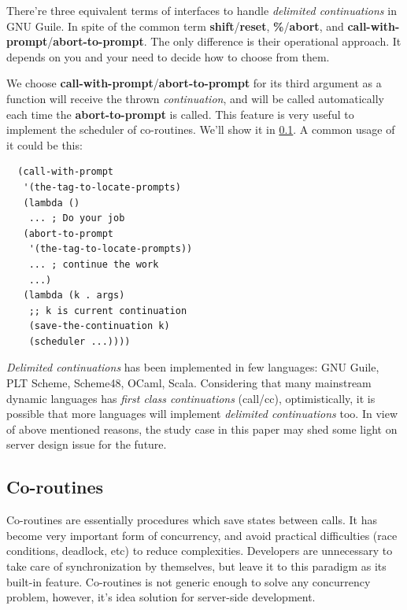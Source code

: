 \documentclass[numbers,numberedpars]{sigplanconf}
\begin{document}
There're three equivalent terms of interfaces to handle {\it delimited continuations} in GNU Guile. In spite of the common term {\bf shift}/{\bf reset},
{\bf \%}/{\bf abort}, and {\bf call-with-prompt}/{\bf abort-to-prompt}. The only difference is their operational approach. It depends on you and your
need to decide how to choose from them.

We choose {\bf call-with-prompt}/{\bf abort-to-prompt} for its third argument as a function will receive the thrown {\it continuation}, and will be
called automatically each time the {\bf abort-to-prompt} is called. This feature is very useful to implement the scheduler of co-routines. We'll show it
in \ref{Co-routines}. A common usage of it could be this:

\begin{lstlisting}
  (call-with-prompt
   '(the-tag-to-locate-prompts)
   (lambda ()
    ... ; Do your job
   (abort-to-prompt
    '(the-tag-to-locate-prompts))
    ... ; continue the work
    ...)
   (lambda (k . args)
    ;; k is current continuation
    (save-the-continuation k)
    (scheduler ...))))
\end{lstlisting}

{\it Delimited continuations} has been implemented in few languages: GNU Guile, PLT Scheme, Scheme48, OCaml, Scala.
Considering that many mainstream dynamic languages has {\it first class continuations} (call/cc), optimistically, it is possible that more languages
will implement {\it delimited continuations} too. In view of above mentioned reasons, the study case in this paper may shed some light on server
design issue for the future.

\subsection{Co-routines} \label{Co-routines}

Co-routines are essentially procedures which save states between calls. It has become very important form of concurrency, and avoid practical
difficulties (race conditions, deadlock, etc) to reduce complexities. Developers are unnecessary to take care of synchronization by
themselves, but leave it to this paradigm as its built-in feature. Co-routines is not generic enough to solve any concurrency problem, however,
it's idea solution for server-side development.
\end{document}
